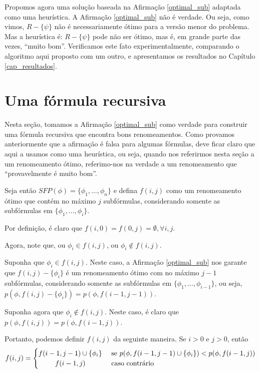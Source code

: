 Propomos agora uma solução baseada na Afirmação \ref{optimal_sub} adaptada como uma heurística. A Afirmação \ref{optimal_sub} não é verdade. Ou seja, como vimos, $R - \{\psi \}$ não é necessariamente ótimo para a versão menor do problema. Mas a heurística é: $R - \{\psi \}$ pode não ser ótimo, mas é, em grande parte das vezes, ``muito bom''. Verificamos este fato experimentalmente, comparando o algoritmo aqui proposto com um outro, e apresentamos os resultados no Capítulo \ref{cap_resultados}.

\section{Uma fórmula recursiva}

\indent

Nesta seção, tomamos a Afirmação \ref{optimal_sub} como verdade para construir uma fórmula recursiva que encontra bons renomeamentos. Como provamos anteriormente que a afirmação é falsa para algumas fórmulas, deve ficar claro que aqui a usamos como uma heurística, ou seja, quando nos referirmos nesta seção a um renomeamento ótimo, referimo-nos na verdade a um renomeamento que ``provavelmente é muito bom''.

Seja então $SFP(\phi) = \{\phi_1,...,\phi_n \}$ e defina $f(i,j)$ como um renomeamento ótimo que contém no máximo $j$ subfórmulas, considerando somente as subfórmulas em $\{\phi_1,...,\phi_i \}$.

Por definição, é claro que $f(i,0) = f(0,j) = \emptyset, \forall i,j$.

Agora, note que, ou $\phi_i \in f(i,j)$, ou $\phi_i \notin f(i,j)$.

Suponha que $\phi_i \in f(i,j)$. Neste caso, a Afirmação \ref{optimal_sub} nos garante que $f(i,j) - \{\phi_i \}$ é um renomeamento ótimo com no máximo $j-1$ subfórmulas, considerando somente as subfórmulas em $\{\phi_1,...,\phi_{i-1} \}$, ou seja, $p(\phi,f(i,j) - \{\phi_i \}) = p(\phi,f(i-1,j-1))$.

Suponha agora que $\phi_i \notin f(i,j)$. Neste caso, é claro que $p(\phi,f(i,j)) = p(\phi,f(i-1,j))$.

Portanto, podemos definir $f(i,j)$ da seguinte maneira. Se $i > 0$ e $j > 0$, então
\[
f(i,j) =
\begin{cases} 
\hfill f(i-1,j-1) \cup \{\phi_i \}   \hfill & \text{ se } p(\phi,f(i-1,j-1) \cup \{\phi_i \}) < p(\phi,f(i-1,j)) \\
\hfill f(i-1,j) \hfill & \text{ caso contrário} \\
\end{cases}
\]


